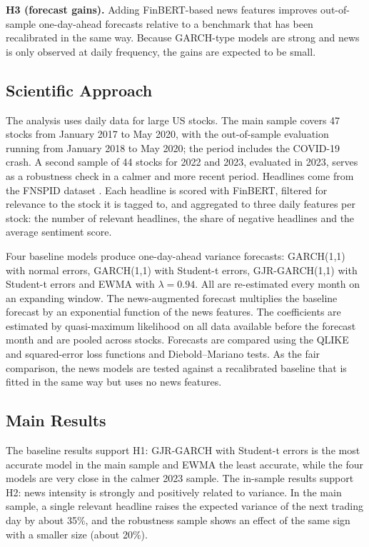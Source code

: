 \documentclass[12pt,a4paper]{article}
\begin{document}
\textbf{H3 (forecast gains).} Adding FinBERT-based news features improves out-of-sample one-day-ahead forecasts relative to a benchmark that has been recalibrated in the same way. Because GARCH-type models are strong and news is only observed at daily frequency, the gains are expected to be small.

\subsection{Scientific Approach}\label{sec:approach}
The analysis uses daily data for large US stocks. The main sample covers 47 stocks from January 2017 to May 2020, with the out-of-sample evaluation running from January 2018 to May 2020; the period includes the COVID-19 crash. A second sample of 44 stocks for 2022 and 2023, evaluated in 2023, serves as a robustness check in a calmer and more recent period. Headlines come from the FNSPID dataset \parencite{dong2024}. Each headline is scored with FinBERT, filtered for relevance to the stock it is tagged to, and aggregated to three daily features per stock: the number of relevant headlines, the share of negative headlines and the average sentiment score.

Four baseline models produce one-day-ahead variance forecasts: GARCH(1,1) with normal errors, GARCH(1,1) with Student-t errors, GJR-GARCH(1,1) with Student-t errors and EWMA with $\lambda = 0.94$. All are re-estimated every month on an expanding window. The news-augmented forecast multiplies the baseline forecast by an exponential function of the news features. The coefficients are estimated by quasi-maximum likelihood on all data available before the forecast month and are pooled across stocks. Forecasts are compared using the QLIKE and squared-error loss functions and Diebold--Mariano tests. As the fair comparison, the news models are tested against a recalibrated baseline that is fitted in the same way but uses no news features.

\subsection{Main Results}\label{sec:main-results}
The baseline results support H1: GJR-GARCH with Student-t errors is the most accurate model in the main sample and EWMA the least accurate, while the four models are very close in the calmer 2023 sample. The in-sample results support H2: news intensity is strongly and positively related to variance. In the main sample, a single relevant headline raises the expected variance of the next trading day by about 35\%, and the robustness sample shows an effect of the same sign with a smaller size (about 20\%).
\end{document}
